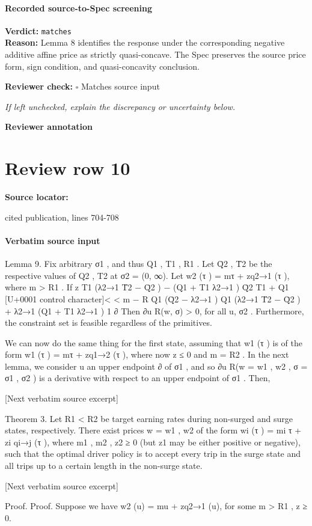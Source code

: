 \documentclass[10pt]{article}
\newcommand{\reviewerbox}{%
  \par\noindent\fbox{\parbox{0.96\linewidth}{\rule{0pt}{0.38in}}}\par
}
\newcommand{\reviewmatch}[1]{%
  \par\noindent\textbf{Reviewer check:} $\square$\; #1\par
  \noindent\emph{If left unchecked, explain the discrepancy or uncertainty below.}\par
}
\begin{document}
\paragraph{Recorded source-to-Spec screening}
\textbf{Verdict:} \texttt{matches}
\\
\textbf{Reason:} Lemma 8 identifies the response under the corresponding negative additive affine price as strictly quasi-concave. The Spec preserves the source price form, sign condition, and quasi-concavity conclusion.
\reviewmatch{Matches source input}
\noindent\textbf{Reviewer annotation}\par
\reviewerbox
\clearpage
\hypertarget{source-claim-7d5af65772b5a76a}{}
\section*{Review row 10}
\textbf{Source locator:} {\footnotesize\raggedright cited publication, lines 704-\allowbreak{}708\par}
\paragraph{Verbatim source input}
\begin{ReviewVerbatim}
Lemma 9. Fix arbitrary σ1 , and thus Q1 , T1 , R1 . Let Q̄2 , T̄2 be the respective values of Q2 , T2 at
σ2 = (0, ∞). Let w2 (τ ) = mτ + zq2→1 (τ ), where m > R1 .
If
z
T1 (λ2→1 T̄2 − Q̄2 ) − (Q1 + T1 λ2→1 )
Q̄2 T1 + Q1
[U+0001 control character]<
<
m
−
R
Q1 (Q̄2 − λ2→1 )
Q1 (λ2→1 T̄2 − Q̄2 ) + λ2→1 (Q1 + T1 λ2→1 )
1
∂
Then ∂u
R(w, σ) > 0, for all u, σ2 . Furthermore, the constraint set is feasible regardless of the
primitives.

We can now do the same thing for the first state, assuming that w1 (τ ) is of the form w1 (τ ) =
mτ + zq1→2 (τ ), where now z ≤ 0 and m = R2 . In the next lemma, we consider u an upper endpoint
∂
of σ1 , and so ∂u
R(w = {w1 , w2 }, σ = {σ1 , σ2 }) is a derivative with respect to an upper endpoint of
σ1 . Then,

[Next verbatim source excerpt]

Theorem 3. Let R1 < R2 be target earning rates during non-surged and surge states, respectively.
There exist prices w = {w1 , w2 } of the form
wi (τ ) = mi τ + zi qi→j (τ ),
where m1 , m2 , z2 ≥ 0 (but z1 may be either positive or negative), such that the optimal driver policy
is to accept every trip in the surge state and all trips up to a certain length in the non-surge state.

[Next verbatim source excerpt]

Proof. Proof.
Suppose we have w2 (u) = mu + zq2→1 (u), for some m > R1 , z ≥ 0.
\end{ReviewVerbatim}
\end{document}
